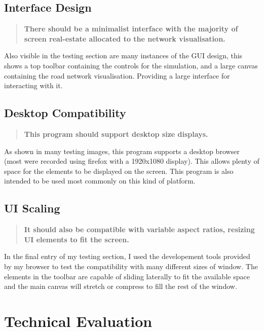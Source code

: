     \subsection{Interface Design}

        \begin{quote}
            \textbf{There should be a minimalist interface with the majority of screen real-estate allocated to the network visualisation.}
        \end{quote}

        Also visible in the testing section are many instances of the GUI design, this shows a top toolbar containing the controls for the simulation, and a large canvas containing the road network visualisation. Providing a large interface for interacting with it.

    \subsection{Desktop Compatibility}

        \begin{quote}
            \textbf{This program should support desktop size displays.}
        \end{quote}

        As shown in many testing images, this program supports a desktop browser (most were recorded using firefox with a 1920x1080 display). This allows plenty of space for the elements to be displayed on the screen. This program is also intended to be used most commonly on this kind of platform.

    \subsection{UI Scaling}

        \begin{quote}
            \textbf{It should also be compatible with variable aspect ratios, resizing UI elements to fit the screen.}
        \end{quote}

        In the final entry of my testing section, I used the developement tools provided by my browser to test the compatibility with many different sizes of window. The elements in the toolbar are capable of sliding laterally to fit the available space and the main canvas will stretch or compress to fill the rest of the window.

\section{Technical Evaluation}

